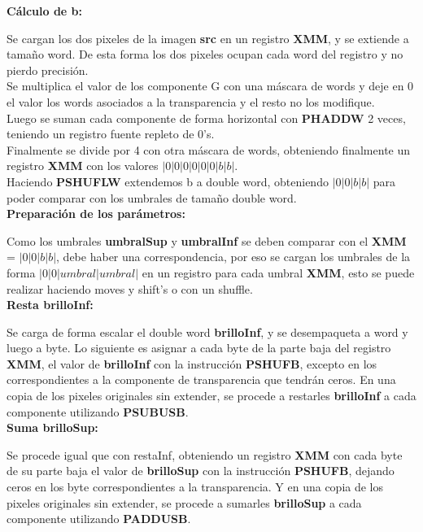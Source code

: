 {\centering\textbf{Cálculo de b:}}

Se cargan los dos pixeles de la imagen \textbf{src} en un registro \textbf{XMM}, y se extiende a tamaño word. De esta forma los dos pixeles ocupan cada word del registro y no pierdo precisión. \\
Se multiplica el valor de los componente G con una máscara de words y deje en 0 el valor los words asociados a la transparencia y el resto no los modifique. \\
Luego se suman cada componente de forma horizontal con \textbf{PHADDW} 2 veces, teniendo un registro fuente repleto de 0's. \\
Finalmente se divide por 4 con otra máscara de words, obteniendo finalmente un registro \textbf{XMM} con los valores $|0|0|0|0|0|0|b|b|$. \\
Haciendo \textbf{PSHUFLW} extendemos b a double word, obteniendo  $|0|0|b|b|$ para poder comparar con los umbrales de tamaño double word. \\

{\centering\textbf{Preparación de los parámetros:}}

Como los umbrales \textbf{umbralSup} y \textbf{umbralInf} se deben comparar con el \textbf{XMM} = $|0|0|b|b|$, debe haber una correspondencia, por eso se cargan los umbrales de la forma $|0|0|umbral|umbral|$ en un registro para cada umbral \textbf{XMM}, esto se puede realizar haciendo moves y shift's o con un shuffle. \\

{\centering\textbf{Resta brilloInf:}}

Se carga de forma escalar el double word \textbf{brilloInf}, y se desempaqueta a word y luego a byte.
Lo siguiente es asignar a cada byte de la parte baja del registro \textbf{XMM}, el valor de \textbf{brilloInf} con la instrucción \textbf{PSHUFB}, excepto en los correspondientes a la componente de transparencia que tendrán ceros.
En una copia de los pixeles originales sin extender, se procede a restarles \textbf{brilloInf} a cada componente utilizando \textbf{PSUBUSB}. \\

{\centering\textbf{Suma brilloSup:}}

Se procede igual que con restaInf, obteniendo un registro \textbf{XMM} con cada byte de su parte baja el valor de \textbf{brilloSup} con la instrucción \textbf{PSHUFB}, dejando ceros en los byte correspondientes a la transparencia.
Y en una copia de los pixeles originales sin extender, se procede a sumarles \textbf{brilloSup} a cada componente utilizando \textbf{PADDUSB}. \\

